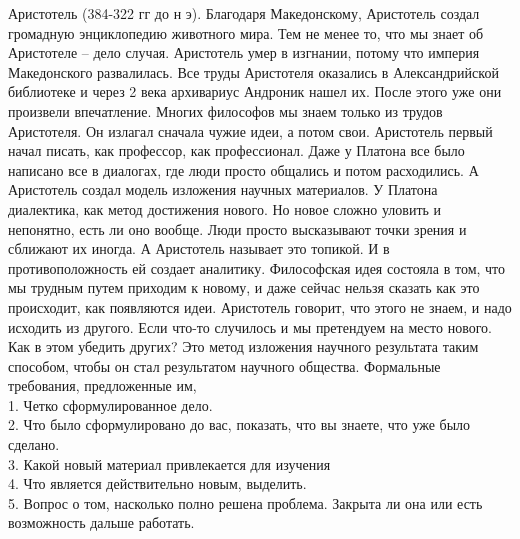 \documentclass[a4paper, 12pt]{article}
\def\t{\hspace*{1cm}}
\begin{document}
Аристотель (384-322 гг до н э). Благодаря Македонскому, Аристотель создал громадную энциклопедию животного мира. Тем не менее то, что мы знает об Аристотеле -- дело случая. Аристотель умер в изгнании, потому что империя Македонского развалилась. Все труды Аристотеля оказались в Александрийской библиотеке и через 2 века архивариус Андроник нашел их. После этого уже они произвели впечатление. Многих философов мы знаем только из трудов Аристотеля. Он излагал сначала чужие идеи, а потом свои. Аристотель первый начал писать, как профессор, как профессионал. Даже у Платона все было написано все в диалогах, где люди просто общались и потом расходились. А Аристотель создал модель изложения научных материалов. У Платона диалектика, как метод достижения нового. Но новое сложно уловить и непонятно, есть ли оно вообще. Люди просто высказывают точки зрения и сближают их иногда. А Аристотель называет это топикой. И в противоположность ей создает аналитику. Философская идея состояла в том, что мы трудным путем приходим к новому, и даже сейчас нельзя сказать как это происходит, как появляются идеи. Аристотель говорит, что этого не знаем, и надо исходить из другого. Если что-то случилось и мы претендуем на место нового. Как в этом убедить других? Это метод изложения научного результата таким способом, чтобы он стал результатом научного общества. Формальные требования, предложенные им, 
\\\t 1. Четко сформулированное дело.
\\\t 2. Что было сформулировано до вас, показать, что вы знаете, что уже было сделано. 
\\\t 3. Какой новый материал привлекается для изучения
\\\t 4. Что является действительно новым, выделить. 
\\\t 5. Вопрос о том, насколько полно решена проблема. Закрыта ли она или есть возможность дальше работать. 
\end{document}
